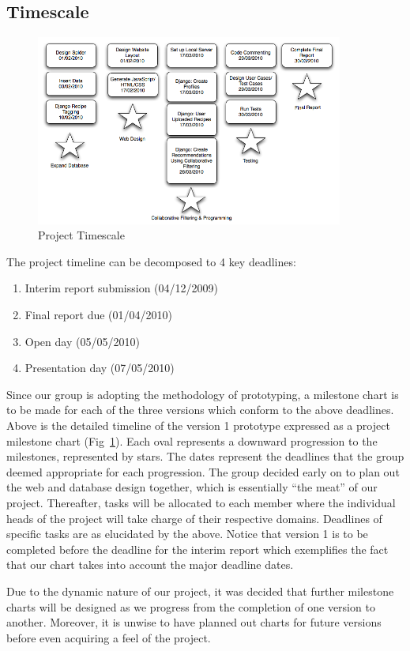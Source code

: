\subsection{Timescale}

\begin{figure}[h]
\includegraphics[width=0.9\textwidth]{milestone}
\caption{Project Timescale}
\label{fig:milestone}
\end{figure}

The project timeline can be decomposed to 4 key deadlines:
\begin{enumerate}
	\item Interim report submission (04/12/2009)
	\item Final report due (01/04/2010)
	\item Open day (05/05/2010)
	\item Presentation day (07/05/2010)

\end{enumerate}



Since our group is adopting the methodology of prototyping, a milestone chart is to be made for each of the three versions which conform to the above deadlines. Above is the detailed timeline of the version 1 prototype expressed as a project milestone chart (Fig~\ref{fig:milestone}).
Each oval represents a downward progression to the milestones, represented by stars. The dates represent the deadlines that the group deemed appropriate for each progression. The group decided early on to plan out the web and database design together, which is essentially “the meat” of our project. Thereafter, tasks will be allocated to each member where the individual heads of the project will take charge of their respective domains. Deadlines of specific tasks are as elucidated by the above. Notice that version 1 is to be completed before the deadline for the interim report which exemplifies the fact that our chart takes into account the major deadline dates.

Due to the dynamic nature of our project, it was decided that further milestone charts will be designed as we progress from the completion of one version to another. Moreover, it is unwise to have planned out charts for future versions before even acquiring a feel of the project.
\newpage

 

